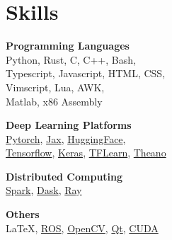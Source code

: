 
\section{\sc Skills}

{\bf Programming Languages} \\
Python, Rust, C, C++, Bash, \\
Typescript, Javascript, HTML, CSS, \\
Vimscript, Lua, AWK, \\
Matlab, x86 Assembly

{\bf Deep Learning Platforms} \\
\href{https://pytorch.org/}{Pytorch},
\href{https://jax.readthedocs.io/}{Jax},
\href{https://huggingface.co}{HuggingFace},
\\
\href{https://www.tensorflow.org/}{Tensorflow},
\href{https://keras.io}{Keras},
\href{http://tflearn.org/}{TFLearn},
\href{http://www.deeplearning.net/software/theano/}{Theano}

{\bf Distributed Computing} \\
\href{https://spark.apache.org}{Spark},
\href{https://www.dask.org}{Dask},
\href{https://www.ray.io}{Ray}

{\bf Others} \\
{\LaTeX},
\href{http://www.ros.org/}{ROS},
\href{https://opencv.org/}{OpenCV},
\href{https://www.qt.io}{Qt},
\href{https://docs.nvidia.com/cuda/}{CUDA}
